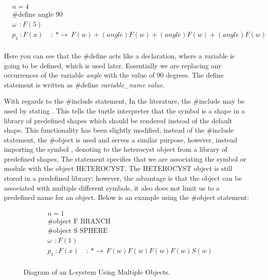 \begin{equation} \label{define statement example}
\begin{aligned}
	&n=4 \\
	&\textrm{\#define angle 90}\\
	&\omega~~ : F(5)\\
	&p_1~ :  F(x)~~~~~ :~ * \rightarrow~ F(w)+(angle)F(w)+(angle)F(w)+(angle)F(w)\\
\end{aligned}
\end{equation}

Here you can see that the \#define acts like a declaration, where a variable is going to be defined, which is used later. Essentially we are replacing any occurrences of the variable \textit{angle} with the value of 90 degrees. The define statement is written as  \#define \textit{variable\_name} \textit{value}.

With regards to the \#include statement, In the literature, the \#include may be used by stating . This tells the turtle interpreter that the symbol  is a shape in a library of predefined shapes which should be rendered instead of the default shape. This functionality has been slightly modified, instead of the \#include statement, the \#object is used and serves a similar purpose, however, instead importing the symbol , denoting to the heterocyst object from a library of predefined shapes, The statement  specifies that we are associating the symbol or module  with the object HETEROCYST. The HETEROCYST object is still stored in a predefined library; however, the advantage is that the object can be associated with multiple different symbols, it also does not limit us to a predefined name for an object. Below is an example using the \#object statement: 

\begin{equation} \label{object statement example}
\begin{aligned}
	&n=1 \\
	&\textrm{\#object F BRANCH}\\
	&\textrm{\#object S SPHERE}\\
	&\omega~~ : F(1)\\
	&p_1~ :  F(x)~~~~~ :~ * \rightarrow~ F(w)F(w)F(w)F(w)S(w)\\
\end{aligned}
\end{equation}

\begin{figure}[htbp]
	{\centering
		\vspace{7px}
		\setlength{\fboxrule}{1pt}
		\caption{Diagram of an L-system Using Multiple Objects.}
	}
\end{figure}
\FloatBarrier

